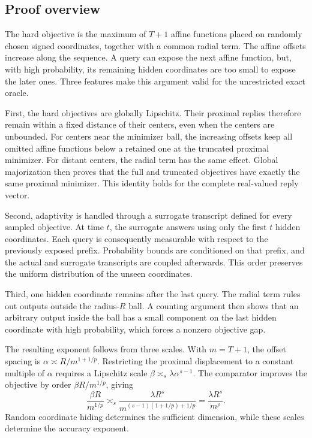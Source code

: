 \documentclass[11pt]{article}
\theoremstyle{definition}
\theoremstyle{remark}
\begin{document}
\subsection{Proof overview}\label{sec:overview}

The hard objective is the maximum of $T+1$ affine functions placed on
randomly chosen signed coordinates, together with a common radial term.
The affine offsets increase along the sequence. A query can expose the
next affine function, but, with high probability, its remaining hidden
coordinates are too small to expose the later ones. Three features make
this argument valid for the unrestricted exact oracle.

First, the hard objectives are globally Lipschitz. Their proximal replies
therefore remain within a fixed distance of their centers, even when the
centers are unbounded. For centers near the minimizer ball, the increasing
offsets keep all omitted affine functions below a retained one at the
truncated proximal minimizer. For distant centers, the radial term has
the same effect. Global majorization then proves that the full and
truncated objectives have exactly the same proximal minimizer. This
identity holds for the complete real-valued reply vector.

Second, adaptivity is handled through a surrogate transcript defined for
every sampled objective. At time $t$, the surrogate answers using only
the first $t$ hidden coordinates. Each query is consequently measurable
with respect to the previously exposed prefix. Probability bounds are
conditioned on that prefix, and the actual and surrogate transcripts are
coupled afterwards. This order preserves the uniform distribution of the
unseen coordinates.

Third, one hidden coordinate remains after the last query. The radial
term rules out outputs outside the radius-$R$ ball. A counting argument
then shows that an arbitrary output inside the ball has a small component
on the last hidden coordinate with high probability, which forces a
nonzero objective gap.

The resulting exponent follows from three scales. With $m=T+1$, the
offset spacing is $\alpha\asymp R/m^{1+1/p}$. Restricting the proximal
displacement to a constant multiple of $\alpha$ requires a Lipschitz
scale $\beta\asymp_s\lambda\alpha^{s-1}$. The comparator improves the
objective by order $\beta R/m^{1/p}$, giving
\[
\frac{\beta R}{m^{1/p}}
\asymp_s\frac{\lambda R^s}{m^{(s-1)(1+1/p)+1/p}}
=\frac{\lambda R^s}{m^\rho}.
\]
Random coordinate hiding determines the sufficient dimension, while
these scales determine the accuracy exponent.
\end{document}
